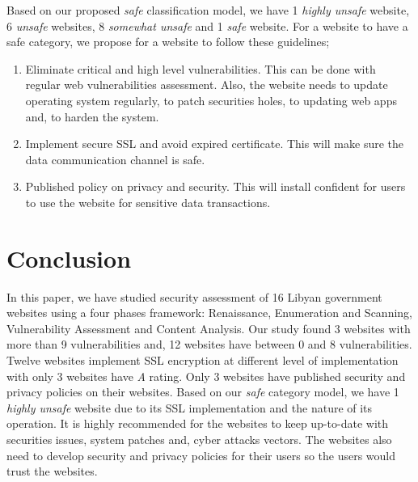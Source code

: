 \documentclass[conference]{IEEEtran}
\begin{document}
Based on our proposed \emph{safe} 
classification model, we have 1 \emph{highly 
	unsafe} website, 6 \emph{unsafe} websites, 8 \emph{somewhat
	unsafe} and 1 \emph{safe} website. For a website to have a safe category, we propose for a website to follow these guidelines;
\begin{enumerate}
	\item Eliminate critical and high level vulnerabilities.
	This can be done with regular web vulnerabilities
	assessment. Also, the website needs to update operating
	system regularly, to patch securities holes, to updating
	web apps and, to harden the system.
	\item Implement secure SSL and avoid expired certificate. This will make sure the data communication channel is safe.
	\item Published
	policy on privacy and security. This will install confident for users to use the website for sensitive data transactions.
\end{enumerate} 




  

%





\section{Conclusion}

In this paper, we have studied security assessment of 16 Libyan
government websites using a four phases framework: Renaissance,
Enumeration and Scanning, Vulnerability Assessment and Content
Analysis. Our study found 3 websites with more than 9 vulnerabilities and, 12 websites have between 0 and 8 vulnerabilities. Twelve websites implement SSL
encryption at different level of implementation with only 3 websites
have \emph{A} rating. Only 3 websites have published security and
privacy policies on their websites. Based on our \emph{safe} category model, we have 1 \emph{highly unsafe} website due to its SSL implementation and the nature of
its operation. It is highly recommended for the websites to keep
up-to-date with securities issues, system patches and, cyber attacks
vectors. The websites also need to develop security and privacy policies
for their users so the users would trust the websites.
\end{document}
